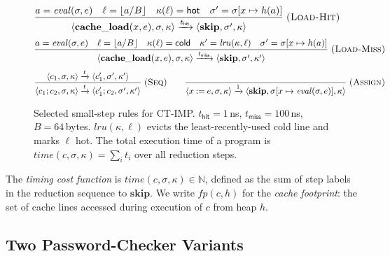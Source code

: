 \begin{figure}[t]
\small
\[
\frac{a = \mathit{eval}(\sigma, e) \quad \ell = \lfloor a/B\rfloor
      \quad \kappa(\ell) = \mathsf{hot} \quad \sigma' = \sigma[x \mapsto h(a)]}
     {\langle \mathbf{cache\_load}(x,e),\sigma,\kappa\rangle
      \xrightarrow{t_\mathsf{hit}}
      \langle \mathbf{skip},\sigma',\kappa\rangle}
\;\textsc{(Load-Hit)}
\]
\[
\frac{a = \mathit{eval}(\sigma, e) \quad \ell = \lfloor a/B\rfloor
      \quad \kappa(\ell) = \mathsf{cold}
      \quad \kappa' = \mathit{lru}(\kappa,\ell)
      \quad \sigma' = \sigma[x \mapsto h(a)]}
     {\langle \mathbf{cache\_load}(x,e),\sigma,\kappa\rangle
      \xrightarrow{t_\mathsf{miss}}
      \langle \mathbf{skip},\sigma',\kappa'\rangle}
\;\textsc{(Load-Miss)}
\]
\[
\frac{\langle c_1,\sigma,\kappa\rangle \xrightarrow{t}
      \langle c_1',\sigma',\kappa'\rangle}
     {\langle c_1;c_2,\sigma,\kappa\rangle \xrightarrow{t}
      \langle c_1';c_2,\sigma',\kappa'\rangle}
\;\textsc{(Seq)}
\qquad
\frac{}{\langle x\mathbin{:=}e,\sigma,\kappa\rangle \xrightarrow{1}
        \langle\mathbf{skip},\sigma[x\mapsto\mathit{eval}(\sigma,e)],\kappa\rangle}
\;\textsc{(Assign)}
\]
\caption{Selected small-step rules for CT-IMP.
  $t_\mathsf{hit}\!=\!1$\,ns, $t_\mathsf{miss}\!=\!100$\,ns,
  $B\!=\!64$\,bytes.
  $\mathit{lru}(\kappa,\ell)$ evicts the least-recently-used cold line
  and marks $\ell$ hot.
  The total execution time of a program is
  $\mathit{time}(c,\sigma,\kappa) = \sum_i t_i$ over all reduction steps.}
\label{fig:ctimp-rules}
\end{figure}

The \emph{timing cost function} is
$\mathit{time}(c,\sigma,\kappa) \in \mathbb{N}$,
defined as the sum of step labels in the reduction sequence to
$\mathbf{skip}$.
We write $\mathit{fp}(c,h)$ for the \emph{cache footprint}:
the set of cache lines accessed during execution of $c$ from heap $h$.

\subsection{Two Password-Checker Variants}

